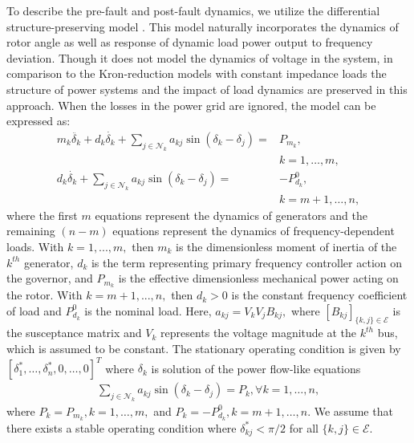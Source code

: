 \documentclass[final]{IEEEtran}
\begin{document}
To describe the pre-fault and post-fault dynamics, we utilize the differential structure-preserving model \cite{bergen1981structure}. 
This model naturally incorporates the dynamics of rotor angle as well as response of
dynamic load power output to frequency deviation. Though it does
not model the dynamics of voltage in the system, in comparison to
the Kron-reduction models with constant impedance loads \cite{386159} the structure of power systems and the
impact of load dynamics  are preserved in this approach. When the
losses in the power grid are ignored, the model can be expressed as:
\begin{align}
\label{eq.structure-preserving}
 m_k \ddot{\delta_k} + d_k \dot{\delta_k} + \sum_{j \in
  \mathcal{N}_k} a_{kj} \sin(\delta_k-\delta_j) = &P_{m_k},  \\
  &k=1,\dots,m,  \nonumber\\
  \label{eq.structure-preserving2}
  d_k \dot{\delta_k} + \sum_{j \in
  \mathcal{N}_k} a_{kj} \sin(\delta_k-\delta_j) = &-P^0_{d_k},  \\
  & k=m+1,\dots,n, \nonumber
\end{align}
where the first $m$ equations represent the dynamics of generators
and the remaining $(n-m)$ equations represent the dynamics of
frequency-dependent loads. With $k=1,...,m,$ then $m_k$ is
the dimensionless moment of inertia of the $k^{th}$ generator,
$d_k$ is the term representing primary frequency controller action
on the governor, and $P_{m_k}$ is the effective dimensionless mechanical
power acting on the rotor. With $k=m+1,...,n,$ then $d_k>0$ is
the constant frequency coefficient of load and $P^0_{d_k}$ is the nominal load. Here, $a_{kj}=V_kV_jB_{kj},$ where
$[B_{kj}]_{\{k,j\} \in \mathcal{E}}$ is the  susceptance matrix and
 $V_k$ represents the voltage magnitude at the $k^{th}$ bus, which is assumed to be constant. The
stationary operating condition is given by
$[\delta_1^*,\dots,\delta_n^*, 0,\dots,0]^T$ where $\delta_k$ is
solution of the power flow-like equations
\begin{align}\label{eq.operatingCondition}
\sum_{j \in
  \mathcal{N}_k} a_{kj} \sin(\delta_k-\delta_j) =P_k, \forall k=1,\dots,n,
\end{align}
where $P_k=P_{m_k}, k=1,\dots,m,$ and $P_k=-P^0_{d_k},
k=m+1,\dots,n.$ We assume that there exists a stable operating
condition where $\delta_{kj}^*<\pi/2$ for all $\{k,j\}\in
\mathcal{E}.$
\end{document}
